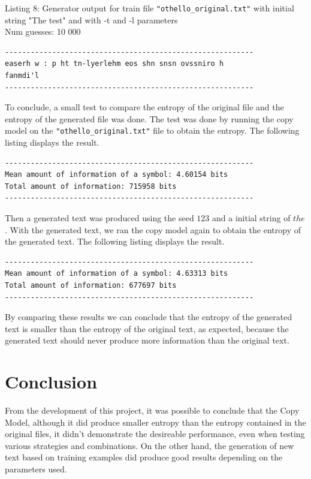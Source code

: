 \documentclass{article}
\begin{document}
Listing 8: Generator output for train file \verb|"othello_original.txt"| with initial string "The test" and with -t and -l parameters
\\Num guesses: 10 000

\begin{lstlisting}
----------------------------------------------------------
easerh w : p ht tn-lyerlehm eos shn snsn ovssniro h  
fanmdi'l
----------------------------------------------------------
\end{lstlisting}

To conclude, a small test to compare the entropy of the original file and the entropy of the generated file was done.
The test was done by running the copy model on the \verb|"othello_original.txt"| file to obtain the entropy. The following listing displays the result.

\begin{lstlisting}
----------------------------------------------------------
Mean amount of information of a symbol: 4.60154 bits
Total amount of information: 715958 bits
----------------------------------------------------------
\end{lstlisting}

Then a generated text was produced using the seed $123$ and a initial string of $the$.
With the generated text, we ran the copy model again to obtain the entropy of the generated text.
The following listing displays the result.

\begin{lstlisting}
----------------------------------------------------------
Mean amount of information of a symbol: 4.63313 bits
Total amount of information: 677697 bits
----------------------------------------------------------
\end{lstlisting}

By comparing these results we can conclude that the entropy of the generated text is smaller than the entropy of the original text,
as expected, because the generated text should never produce more information than the original text.

\section{Conclusion}
\label{sec:conclusion}

From the development of this project, it was possible to conclude that the Copy
Model, although it did produce smaller entropy than the entropy contained in the original files,
it didn't demonstrate the desireable performance, even when testing various strategies and combinations.
On the other hand, the generation of new text based on training examples did produce good results depending on the parameters used.
\end{document}
